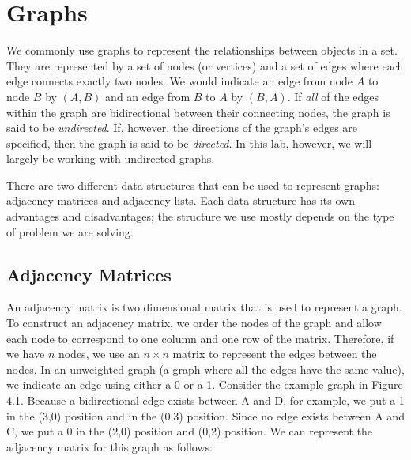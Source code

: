 \label{lab:SixDegreesKevinBacon}


\section*{Graphs}
We commonly use graphs to represent the relationships between objects in a set. They are
represented by a set of nodes (or vertices) and a set of edges where each edge
connects exactly two nodes. We would indicate an edge from node $A$ to node $B$ by $(A, B)$
and an edge from $B$ to $A$ by $(B,A)$. If \emph{all} of the edges within the graph are bidirectional
between their connecting nodes, the graph is said to be \emph{undirected}. If, however, the directions
of the graph's edges are specified, then the graph is said to be \emph{directed}. In this lab, however, we will largely be working
with undirected graphs.

There are two different data structures that can be used to represent graphs: adjacency matrices and adjacency lists.
Each data structure has its own advantages and disadvantages;
the structure we use mostly depends on the type of problem we are solving.

\subsection*{Adjacency Matrices}
An adjacency matrix is two dimensional matrix that is used to represent a graph. To construct an adjacency matrix, we order
the nodes of the graph and allow each node to correspond to one column and one
row of the matrix. Therefore, if we have $n$ nodes, we use an $n \times n$ matrix to
represent the edges between the nodes. In an unweighted graph (a graph where all the edges have the same value), we indicate an
edge using either a 0 or a 1.
Consider the example graph in Figure 4.1. Because a bidirectional edge exists between A and D, for example, we put a 1 in the (3,0) position and
in the (0,3) position. Since no edge exists between A and C, we put a 0 in
the (2,0) position and (0,2) position. We can represent the adjacency matrix for this graph as follows:

